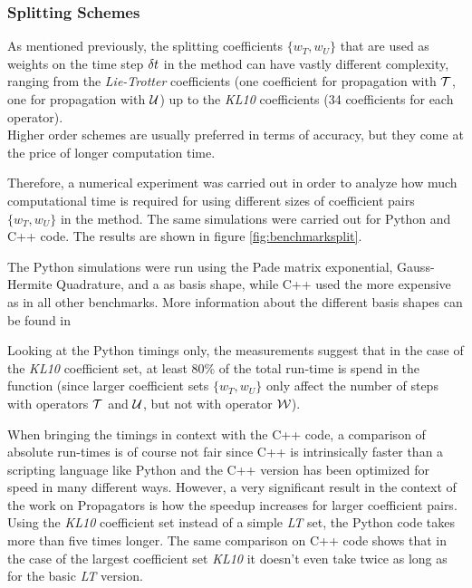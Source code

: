 \subsubsection{Splitting Schemes}
%
As mentioned previously, the splitting coefficients $\{ w_T, w_U \}$ that are used as weights on the time step $\delta t$ in the  method can have vastly different complexity, ranging from the \emph{Lie-Trotter} coefficients (one coefficient for propagation with $\mathcal{T}$, one for propagation with $\mathcal{U}$) up to the \emph{KL10} coefficients (34 coefficients for each operator). \\
Higher order schemes are usually preferred in terms of accuracy, but they come at the price of longer computation time.
\par\medskip
%
Therefore, a numerical experiment was carried out in order to analyze how much computational time is required for using different sizes of coefficient pairs $\{ w_T, w_U \}$ in the  method.
The same simulations were carried out for Python and C++ code.
The results are shown in figure \ref{fig:benchmarksplit}.
\par\medskip
%
The Python simulations were run using the Pade matrix exponential, Gauss-Hermite Quadrature, and a  as basis shape, while
C++ used the more expensive  as in all other benchmarks.
More information about the different basis shapes can be found in \cite{B_master_thesis}
\par\medskip
%
Looking at the Python timings only, the measurements suggest that in the case of the \emph{KL10} coefficient set, at least 80\% of the total run-time is spend in the  function (since larger coefficient sets $\{ w_T, w_U \}$ only affect the number of steps with operators $\mathcal{T}$ and $\mathcal{U}$, but not with operator $\mathcal{W}$).
\par\medskip
%
When bringing the timings in context with the C++ code, a comparison of absolute run-times is of course not fair since C++ is intrinsically faster than a scripting language like Python and the C++ version has been optimized for speed in many different ways.
However, a very significant result in the context of the work on Propagators is how the speedup increases for larger coefficient pairs.
Using the \emph{KL10} coefficient set instead of a simple \emph{LT} set, the Python code takes more than five times longer.
The same comparison on C++ code shows that in the case of the largest coefficient set \emph{KL10} it doesn't even take twice as long as for the basic \emph{LT} version.
